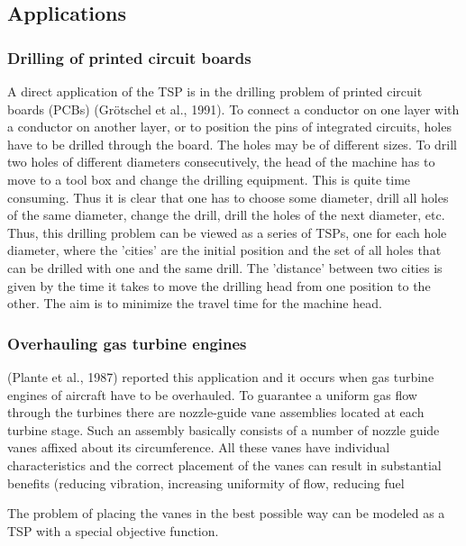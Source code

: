 \subsection{Applications}

\subsubsection{Drilling of printed circuit boards}

A direct application of the TSP is in the drilling problem of printed circuit boards (PCBs) (Grötschel et al., 1991). To connect a conductor on one layer with a conductor on another layer, or to position the pins of integrated circuits, holes have to be drilled through the board. The holes may be of different sizes. To drill two holes of different diameters consecutively, the head of the machine has to move to a tool box and change the drilling equipment. This is quite time consuming. Thus it is clear that one has to choose some diameter, drill all holes of the same diameter, change the drill, drill the holes of the next diameter, etc. Thus, this drilling problem can be viewed as a series of TSPs, one for each hole diameter, where the 'cities' are the initial position and the set of all holes that can be drilled with one and the same drill. The 'distance' between two cities is given by the time it takes to move the drilling head from one position to the other. The aim is to minimize the travel time for the machine head.

\subsubsection{Overhauling gas turbine engines}
(Plante et al., 1987) reported this application and it occurs when gas turbine engines of aircraft have to be overhauled. To guarantee a uniform gas flow through the turbines there are nozzle-guide vane assemblies located at each turbine stage. Such an assembly basically consists of a number of nozzle guide vanes affixed about its circumference. All these vanes have individual characteristics and the correct placement of the vanes can result in substantial benefits (reducing vibration, increasing uniformity of flow, reducing fuel 

The problem of placing the vanes in the best possible way can be modeled as
a TSP with a special objective function. 

